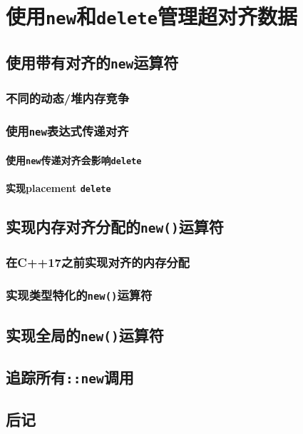 \chapter{使用\texttt{new}和\texttt{delete}管理超对齐数据}\label{ch30}

\section{使用带有对齐的\texttt{new}运算符}

\subsection{不同的动态/堆内存竞争}

\subsection{使用\texttt{new}表达式传递对齐}

\subsubsection{使用\texttt{new}传递对齐会影响\texttt{delete}}
\subsubsection{实现placement \texttt{delete}}\label{ch30.1.2.2}

\section{实现内存对齐分配的\texttt{new()}运算符}
\subsection{在C++17之前实现对齐的内存分配}
\subsection{实现类型特化的\texttt{new()}运算符}\label{ch30.2.2}

\section{实现全局的\texttt{new()}运算符}

\section{追踪所有\texttt{::new}调用}\label{ch30.4}

\section{后记}